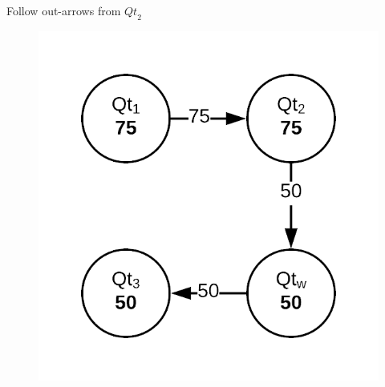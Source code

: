 \documentclass[10pt]{beamer}
\begin{document}
\begin{frame}[fragile]{Follow out-arrows from $\mathit{Qt}_2$}
    \begin{figure}
        \center
        \includegraphics[scale=0.27]{apollo_session_aware_caching_3}
    \end{figure}
\end{frame}
\end{document}
